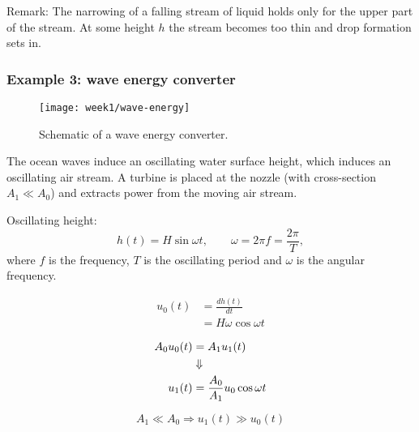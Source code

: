 \begin{framed}
Remark: The narrowing of a falling stream of liquid holds only for the upper part of the stream. At some height $h$ the stream becomes too thin and drop formation sets in.
\end{framed}


\subsubsection{Example 3: wave energy converter}
\begin{figure}[h!]
    \centering
    \texttt{[image: week1/wave-energy]}
    \caption{Schematic of a wave energy converter.}
    \label{fig:wave-energy}
\end{figure}
The ocean waves induce an oscillating water surface height, which induces an oscillating air stream. A turbine is placed at the nozzle (with cross-section $A_1\ll A_0$) and extracts power from the moving air stream.

Oscillating height:
\begin{equation}
    h(t) = H \sin \omega t, \qquad \omega = 2\pi f = \frac{2\pi}{T},
    \label{}
\end{equation}
where $f$ is the frequency, $T$ is the oscillating period and $\omega$ is the angular frequency.

\begin{align}
    u_0(t) &= \frac{dh(t)}{dt}\\
    &= H\omega \cos \omega t
    \label{}
\end{align}

\begin{align}
    A_0 u_0(t) &= A_1u_1(t)\\
    &\Downarrow\notag\\
    u_1(t) &= \frac{A_0}{A_1}u_0 \cos \omega t
    \label{}
\end{align}

\begin{equation}
    A_1 \ll A_0 \Rightarrow u_1(t) \gg u_0(t)
    \label{}
\end{equation}


